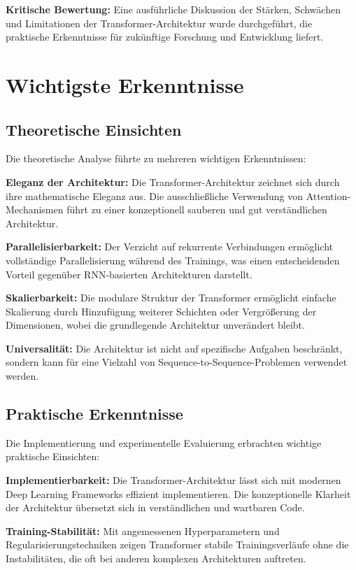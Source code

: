 \textbf{Kritische Bewertung:} Eine ausführliche Diskussion der Stärken, Schwächen und Limitationen der Transformer-Architektur wurde durchgeführt, die praktische Erkenntnisse für zukünftige Forschung und Entwicklung liefert.

\section{Wichtigste Erkenntnisse}

\subsection{Theoretische Einsichten}

Die theoretische Analyse führte zu mehreren wichtigen Erkenntnissen:

\textbf{Eleganz der Architektur:} Die Transformer-Architektur zeichnet sich durch ihre mathematische Eleganz aus. Die ausschließliche Verwendung von Attention-Mechanismen führt zu einer konzeptionell sauberen und gut verständlichen Architektur.

\textbf{Parallelisierbarkeit:} Der Verzicht auf rekurrente Verbindungen ermöglicht vollständige Parallelisierung während des Trainings, was einen entscheidenden Vorteil gegenüber RNN-basierten Architekturen darstellt.

\textbf{Skalierbarkeit:} Die modulare Struktur der Transformer ermöglicht einfache Skalierung durch Hinzufügung weiterer Schichten oder Vergrößerung der Dimensionen, wobei die grundlegende Architektur unverändert bleibt.

\textbf{Universalität:} Die Architektur ist nicht auf spezifische Aufgaben beschränkt, sondern kann für eine Vielzahl von Sequence-to-Sequence-Problemen verwendet werden.

\subsection{Praktische Erkenntnisse}

Die Implementierung und experimentelle Evaluierung erbrachten wichtige praktische Einsichten:

\textbf{Implementierbarkeit:} Die Transformer-Architektur lässt sich mit modernen Deep Learning Frameworks effizient implementieren. Die konzeptionelle Klarheit der Architektur übersetzt sich in verständlichen und wartbaren Code.

\textbf{Training-Stabilität:} Mit angemessenen Hyperparametern und Regularisierungstechniken zeigen Transformer stabile Trainingsverläufe ohne die Instabilitäten, die oft bei anderen komplexen Architekturen auftreten.

